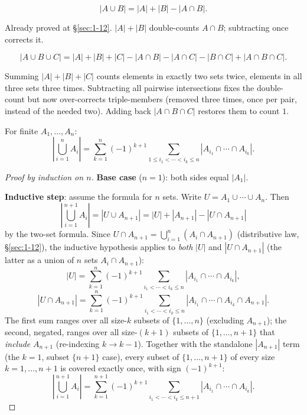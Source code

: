 \documentclass[11pt]{article}
\begin{document}
\begin{theorem}
\[
|A\cup B| = |A|+|B|-|A\cap B|.
\]
\end{theorem}
\begin{note}
Already proved at \S\ref{sec:1-12}. $|A|+|B|$ double-counts $A\cap B$; subtracting once corrects it.
\end{note}

\begin{theorem}
\[
|A\cup B\cup C| = |A|+|B|+|C| - |A\cap B|-|A\cap C|-|B\cap C| + |A\cap B\cap C|.
\]
\end{theorem}
\begin{note}
Summing $|A|+|B|+|C|$ counts elements in exactly two sets twice, elements in all three sets three times. Subtracting all pairwise intersections fixes the double-count but now over-corrects triple-members (removed three times, once per pair, instead of the needed two). Adding back $|A\cap B\cap C|$ restores them to count $1$.
\end{note}

\bigskip
\begin{theorem}
For finite $A_1,\dots,A_n$:
\[
\left|\bigcup_{i=1}^n A_i\right| = \sum_{k=1}^n (-1)^{k+1} \sum_{1\le i_1<\cdots<i_k\le n} |A_{i_1}\cap\cdots\cap A_{i_k}|.
\]
\end{theorem}
\begin{proof}[Proof by induction on $n$]
\textbf{Base case} ($n=1$): both sides equal $|A_1|$.

\medskip
\textbf{Inductive step}: assume the formula for $n$ sets. Write $U=A_1\cup\cdots\cup A_n$. Then
\[
\left|\bigcup_{i=1}^{n+1}A_i\right| = |U \cup A_{n+1}| = |U| + |A_{n+1}| - |U\cap A_{n+1}|
\]
by the two-set formula. Since $U\cap A_{n+1} = \bigcup_{i=1}^n (A_i\cap A_{n+1})$ (distributive law, \S\ref{sec:1-12}), the inductive hypothesis applies to \emph{both} $|U|$ and $|U\cap A_{n+1}|$ (the latter as a union of $n$ sets $A_i\cap A_{n+1}$):
\[
|U| = \sum_{k=1}^n(-1)^{k+1}\!\!\sum_{i_1<\cdots<i_k\le n}\!\! |A_{i_1}\cap\cdots\cap A_{i_k}|,
\]
\[
|U\cap A_{n+1}| = \sum_{k=1}^n(-1)^{k+1}\!\!\sum_{i_1<\cdots<i_k\le n}\!\! |A_{i_1}\cap\cdots\cap A_{i_k}\cap A_{n+1}|.
\]
The first sum ranges over all size-$k$ subsets of $\{1,\dots,n\}$ (excluding $A_{n+1}$); the second, negated, ranges over all size-$(k{+}1)$ subsets of $\{1,\dots,n+1\}$ that \emph{include} $A_{n+1}$ (re-indexing $k\to k-1$). Together with the standalone $|A_{n+1}|$ term (the $k=1$, subset $\{n{+}1\}$ case), every subset of $\{1,\dots,n+1\}$ of every size $k=1,\dots,n+1$ is covered exactly once, with sign $(-1)^{k+1}$:
\[
\left|\bigcup_{i=1}^{n+1}A_i\right| = \sum_{k=1}^{n+1}(-1)^{k+1}\!\!\sum_{i_1<\cdots<i_k\le n+1}\!\! |A_{i_1}\cap\cdots\cap A_{i_k}|.
\]
\end{proof}
\end{document}
